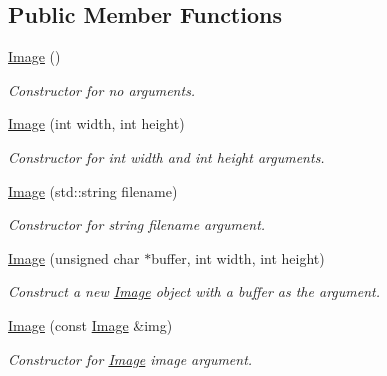 \subsection*{Public Member Functions}
\begin{DoxyCompactItemize}
\item 
\mbox{\label{classImage_a58edd1c45b4faeb5f789b0d036d02313}} 
\hyperlink{classImage_a58edd1c45b4faeb5f789b0d036d02313}{Image} ()
\begin{DoxyCompactList}\small\item\em Constructor for no arguments. \end{DoxyCompactList}\item 
\mbox{\label{classImage_afb0339b802ed560e69eb07358d30198f}} 
\hyperlink{classImage_afb0339b802ed560e69eb07358d30198f}{Image} (int width, int height)
\begin{DoxyCompactList}\small\item\em Constructor for int width and int height arguments. \end{DoxyCompactList}\item 
\mbox{\label{classImage_abb20937b3256735f0f7549d1b5e9c10d}} 
\hyperlink{classImage_abb20937b3256735f0f7549d1b5e9c10d}{Image} (std\+::string filename)
\begin{DoxyCompactList}\small\item\em Constructor for string filename argument. \end{DoxyCompactList}\item 
\hyperlink{classImage_a50994051928f5e597226aea5139aea6d}{Image} (unsigned char $\ast$buffer, int width, int height)
\begin{DoxyCompactList}\small\item\em Construct a new \hyperlink{classImage}{Image} object with a buffer as the argument. \end{DoxyCompactList}\item 
\mbox{\label{classImage_aa44ed77d00d96d2c878b050835f828c4}} 
\hyperlink{classImage_aa44ed77d00d96d2c878b050835f828c4}{Image} (const \hyperlink{classImage}{Image} \&img)
\begin{DoxyCompactList}\small\item\em Constructor for \hyperlink{classImage}{Image} image argument. \end{DoxyCompactList}\item 

\end{DoxyCompactItemize}

